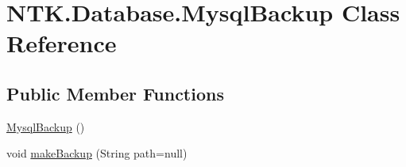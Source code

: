 \hypertarget{class_n_t_k_1_1_database_1_1_mysql_backup}{}\section{N\+T\+K.\+Database.\+Mysql\+Backup Class Reference}
\label{class_n_t_k_1_1_database_1_1_mysql_backup}
\subsection*{Public Member Functions}
\begin{DoxyCompactItemize}
\item 
\mbox{\hyperlink{class_n_t_k_1_1_database_1_1_mysql_backup_a259db9b8c963cd33600a1ce9e9ae74d0}{Mysql\+Backup}} ()
\item 
void \mbox{\hyperlink{class_n_t_k_1_1_database_1_1_mysql_backup_a38e8372c8454d314d06b619ae508c2d8}{make\+Backup}} (String path=null)
\end{DoxyCompactItemize}
